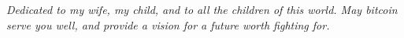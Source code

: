 
\newpage \vspace*{8cm}
\thispagestyle{empty}
\begin{center}
  \Large \emph{
  Dedicated to my wife, my child, and to all the children of this world. May
  bitcoin serve you well, and provide a vision for a future worth fighting for.
  }
\end{center}
